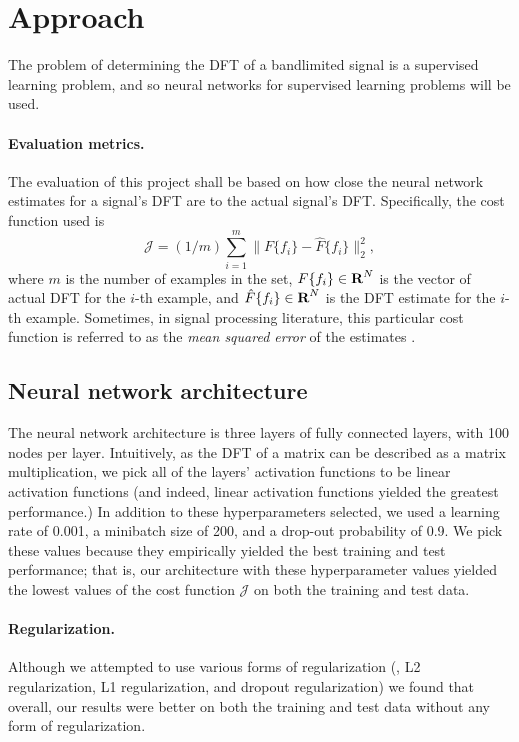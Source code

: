\documentclass[12pt]{article}
\begin{document}
\section{Approach} \label{s-approach}
The problem of determining the DFT of a bandlimited signal is a supervised learning problem, and so
neural networks for supervised learning problems will be used.

\paragraph{Evaluation metrics.}
The evaluation of this project shall be based on how close the neural network estimates for 
a signal's DFT are to the actual signal's DFT. Specifically, the cost function used is
\[
\mathcal J = (1/m) \sum_{i = 1}^{m} \|F\{f_i\} - \hat{F}\{f_i\} \|_2^2,
\]
where $m$ is the number of examples in the set, $F\{f_i\} \in {\mbox{\bf R}}^N$ is the vector of actual DFT 
for the $i$-th example, and $\hat{F}\{f_i\} \in {\mbox{\bf R}}^N$ is the DFT estimate for the $i$-th example. 
Sometimes, in signal processing literature, this particular cost function is referred to as the 
\emph{mean squared error} of the estimates \cite{DG:10}.

\subsection{Neural network architecture} The neural network architecture is three layers of 
fully connected layers, with 100 nodes per layer. Intuitively, as the DFT of a matrix can be described 
as a matrix multiplication, we pick all of the layers' activation functions to be linear activation 
functions (and indeed, linear activation functions yielded the greatest performance.) In addition to these 
hyperparameters selected, we used a learning rate of 0.001, a minibatch size of 200, and a drop-out 
probability of 0.9. We pick these values because they empirically yielded 
the best training and test performance; that is, our architecture with these hyperparameter values 
yielded the lowest values of the cost function $\mathcal J$ on both the training and test data.

\paragraph{Regularization.} Although we attempted to use various forms of regularization (\ie, L2 regularization, 
L1 regularization, and dropout regularization) we found that overall, our results were better on both the training 
and test data without any form of regularization.
\end{document}
